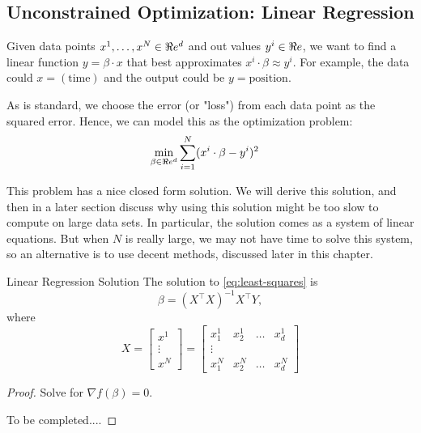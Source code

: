 \subsection{Unconstrained Optimization: Linear Regression}

Given data points $x^1, \dots, x^N \in \Re e^d$ and out values $y^i \in \Re e$, we want to find a linear function $y = \beta \cdot x$ that best approximates $x^i \cdot \beta \approx y^i$.  For example, the data could $x = (\text{time})$ and the output could be $y = \text{position}$.  



\begin{figure}[H]
\begin{center}



\footnotemark
\end{center}
\end{figure}



As is standard, we choose the error (or "loss") from each data point as the squared error.  Hence, we can model this as the optimization problem:
\begin{align}
\label{eq:least-squares}
\min_{\beta \in \Re e^d} & \sum_{i=1}^N (x^i \cdot \beta - y^i)^2
\end{align}

This problem has a nice closed form solution.  We will derive this solution, and then in a later section discuss why using this solution might be too  slow to compute on large data sets.  In particular, the solution comes as a system of linear equations.  But when $N$ is really large, we may not have time to solve this system, so an alternative is to use decent methods, discussed later in this chapter.

\begin{theorem}{Linear Regression Solution}{}
The solution to \eqref{eq:least-squares} is 
\begin{equation}
\beta = (X^\top X)^{-1} X^\top Y,
\end{equation}
where 
$$X = 
\begin{bmatrix}
x^1\\
\vdots \\
x^N
\end{bmatrix}
= 
\begin{bmatrix}
x^1_1 & x^1_2 & \dots & x^1_d\\
\vdots \\
x^N_1 & x^N_2 & \dots & x^N_d
\end{bmatrix}
$$
\end{theorem}
\begin{proof}
Solve for $\nabla f(\beta) = 0$.

To be completed....
\end{proof}

